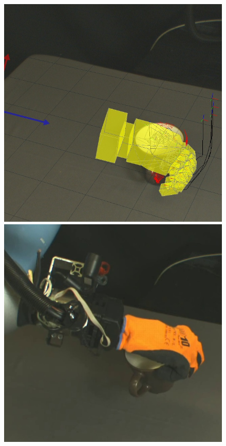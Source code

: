 \begin{figure}
\begin{center}
  \includegraphics[width=\tw]{images/experiments/query/mug1-1-s} \hspace{-6pt}
 \includegraphics[width=\tw]{images/experiments/exec/mug1-s}\\ [1ex]

\end{center}
\end{figure}
